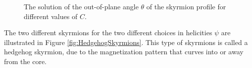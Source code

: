 \begin{figure}[h!]
\begin{center}
\caption{The solution of the out-of-plane angle $\theta$ of the skyrmion profile for different values of $C$.}
\label{fig:ThetaProfile} 
\end{center}
\end{figure}
The two different skyrmions for the two different choices in helicities $\psi$ are illustrated in Figure \ref{fig:HedgehogSkyrmions}. This type of skyrmions is called a hedgehog skyrmion, due to the magnetization pattern that curves into or away from the core.
